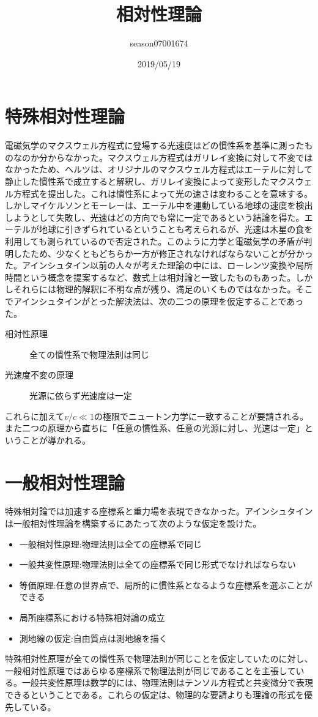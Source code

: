 \documentclass{jsarticle}
\title{相対性理論}
\author{season07001674}
\date{2019/05/19}
\newcommand{\newpart}[1]{\part{#1}\setcounter{section}{0}}
\begin{document}
\maketitle
\tableofcontents

\newpart{特殊相対性理論}

電磁気学のマクスウェル方程式に登場する光速度はどの慣性系を基準に測ったものなのか分からなかった。マクスウェル方程式はガリレイ変換に対して不変ではなかったため、ヘルツは、オリジナルのマクスウェル方程式はエーテルに対して静止した慣性系で成立すると解釈し、ガリレイ変換によって変形したマクスウェル方程式を提出した。これは慣性系によって光の速さは変わることを意味する。しかしマイケルソンとモーレーは、エーテル中を運動している地球の速度を検出しようとして失敗し、光速はどの方向でも常に一定であるという結論を得た。エーテルが地球に引きずられているということも考えられるが、光速は木星の食を利用しても測られているので否定された。このように力学と電磁気学の矛盾が判明したため、少なくともどちらか一方が修正されなければならないことが分かった。アインシュタイン以前の人々が考えた理論の中には、ローレンツ変換や局所時間という概念を提案するなど、数式上は相対論と一致したものもあった。しかしそれらには物理的解釈に不明な点が残り、満足のいくものではなかった。そこでアインシュタインがとった解決法は、次の二つの原理を仮定することであった。
\begin{description}
    \item[相対性原理] 全ての慣性系で物理法則は同じ
    \item[光速度不変の原理] 光源に依らず光速度は一定
\end{description}
これらに加えて$v/c \ll 1$の極限でニュートン力学に一致することが要請される。また二つの原理から直ちに「任意の慣性系、任意の光源に対し、光速は一定」ということが導かれる。


\newpart{一般相対性理論}

特殊相対論では加速する座標系と重力場を表現できなかった。アインシュタインは一般相対性理論を構築するにあたって次のような仮定を設けた。
\begin{itemize}
    \item 一般相対性原理:物理法則は全ての座標系で同じ
    \item 一般共変性原理:物理法則は全ての座標系で同じ形式でなければならない
    \item 等価原理:任意の世界点で、局所的に慣性系となるような座標系を選ぶことができる
    \item 局所座標系における特殊相対論の成立
    \item 測地線の仮定:自由質点は測地線を描く
\end{itemize}
特殊相対性原理が全ての慣性系で物理法則が同じことを仮定していたのに対し、一般相対性原理ではあらゆる座標系で物理法則が同じであることを主張している。一般共変性原理は数学的には、物理法則はテンソル方程式と共変微分で表現できるということである。これらの仮定は、物理的な要請よりも理論の形式を優先している。

\end{document}
